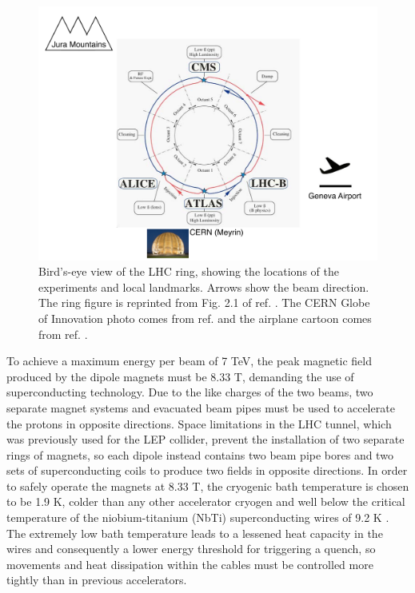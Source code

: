\documentclass[dissertation.tex]{subfiles}
\begin{document}
\begin{figure}
	\centering
	\includegraphics[scale=0.3]{LHC_layout}
	\caption{Bird's-eye view of the LHC ring, showing the locations of the experiments and local landmarks.  Arrows show the beam direction.  The ring figure is reprinted from Fig. 2.1 of ref. \cite{LHC_paper}.  The CERN Globe of Innovation photo comes from ref. \cite{CERN_Globe} and the airplane cartoon comes from ref. \cite{airplane}.}
	\label{fig:LHC_layout}
\end{figure}

To achieve a maximum energy per beam of 7 TeV, the peak magnetic field produced by the dipole magnets must be 8.33 T, demanding the use of superconducting technology.  Due to the like charges of the two beams, two separate magnet systems and evacuated beam pipes must be used to accelerate the protons in opposite directions.  Space limitations in the LHC tunnel, which was previously used for the LEP collider, prevent the installation of two separate rings of magnets, so each dipole instead contains two beam pipe bores and two sets of superconducting coils to produce two fields in opposite directions.  In order to safely operate the magnets at 8.33 T, the cryogenic bath temperature is chosen to be 1.9 K, colder than any other accelerator cryogen and well below the critical temperature of the niobium-titanium (NbTi) superconducting wires of 9.2 K \cite{Flukiger}.  The extremely low bath temperature leads to a lessened heat capacity in the wires and consequently a lower energy threshold for triggering a quench, so movements and heat dissipation within the cables must be controlled more tightly than in previous accelerators.
\end{document}
